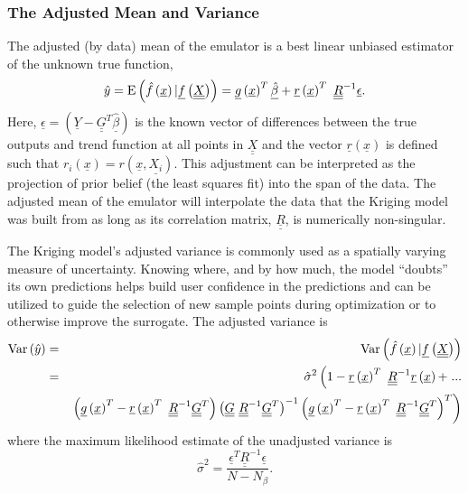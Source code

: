 \documentclass{article}
\begin{document}
\subsubsection{The Adjusted Mean and Variance}
The adjusted (by data) mean of the emulator is a best linear unbiased 
estimator of the unknown true function,
\begin{equation}
\hat{y}={\rm E}\left(\hat{f}\left(\underline{x}\right)|\underline{f}\left(\underline{\underline{X}}\right)\right)=\underline{g}\left(\underline{x}\right)^T\underline{\hat{\beta}}+\underline{r}\left(\underline{x}\right)^T\ \underline{\underline{R}}^{-1}\underline{\epsilon}.
\label{Eq:KrigMean}
\end{equation}
Here, $\underline{\epsilon}=\left(\underline{Y}-\underline{\underline{G}}^T\underline{\hat{\beta}}\right)$ 
is the known vector of differences between the true outputs and trend 
function at all points in $\underline{\underline{X}}$ and the vector 
$\underline{r}\left(\underline{x}\right)$ is defined such that
$r_i\left(\underline{x}\right)=r\left(\underline{x},\underline{X_i}\right)$.  
This adjustment can be interpreted as the projection of prior belief 
(the least squares fit) into the span of the data. The adjusted mean 
of the emulator will interpolate the data that the Kriging model was 
built from as long as its correlation matrix, $\underline{\underline{R}}$, 
is numerically non-singular.\newline

The Kriging model's adjusted variance is commonly used as a spatially 
varying measure of uncertainty.  Knowing where, and by how much, the 
model ``doubts'' its own predictions helps build user confidence in 
the predictions and can be utilized to guide the selection of new 
sample points during optimization or to otherwise improve the 
surrogate.  The adjusted variance is
\begin{eqnarray*}
{\rm Var}\left(\hat{y}\right) &=& {\rm Var}\left(\hat{f}\left(\underline{x}\right)|\underline{f}\left(\underline{\underline{X}}\right)\right) \\ 
&=&\hat{\sigma}^2\left(1-\underline{r}\left(\underline{x}\right)^T\ \underline{\underline{R}}^{-1}\underline{r}\left(\underline{x}\right) + \right. ... \\
&&\left. \left(\underline{g}\left(\underline{x}\right)^T-\underline{r}\left(\underline{x}\right)^T\ \underline{\underline{R}}^{-1}\underline{\underline{G}}^T\right) \left(\underline{\underline{G}}\ \underline{\underline{R}}^{-1} \underline{\underline{G}}^T\right)^{-1}\left(\underline{g}\left(\underline{x}\right)^T-\underline{r}\left(\underline{x}\right)^T\ \underline{\underline{R}}^{-1}\underline{\underline{G}}^T\right)^T\right)
\end{eqnarray*}
where the maximum likelihood estimate of the unadjusted variance is
\begin{displaymath}
\hat{\sigma}^2=\frac{\underline{\epsilon}^T\underline{\underline{R}}^{-1}\underline{\epsilon}}{N-N_{\beta}}.
\end{displaymath}
\end{document}
